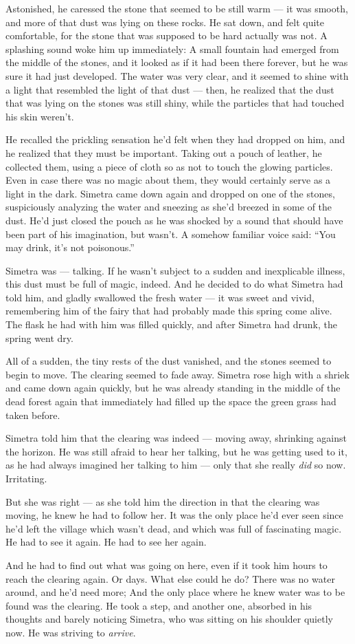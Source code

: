 Astonished, he caressed the stone that seemed to be still warm --- it was smooth, and more of that dust was lying on these rocks. He sat down, and felt quite comfortable, for the stone that was supposed to be hard actually was not.
A splashing sound woke him up immediately: A small fountain had emerged from the middle of the stones, and it looked as if it had been there forever, but he was sure it had just developed. 
The water was very clear, and it seemed to shine with a light that resembled the light of that dust --- then, he realized that the dust that was lying on the stones was still shiny, while the particles that had touched his skin weren't.

He recalled the prickling sensation he'd felt when they had dropped on him, and he realized that they must be important. Taking out a pouch of leather, he collected them, using a piece of cloth so as not to touch the glowing particles. Even in case there was no magic about them, they would certainly serve as a light in the dark. 
Simetra came down again and dropped on one of the stones, suspiciously analyzing the water and sneezing as she'd breezed in some of the dust. 
He'd just closed the pouch as he was shocked by a sound that should have been part of his imagination, but wasn't. A somehow familiar voice said: \enquote{You may drink, it's not poisonous.}

Simetra was --- talking.
If he wasn't subject to a sudden and inexplicable illness, this dust must be full of magic, indeed. 
And he decided to do what Simetra had told him, and gladly swallowed the fresh water --- it was sweet and vivid, remembering him of the fairy that had probably made this spring come alive. The flask he had with him was filled quickly, and after Simetra had drunk, the spring went dry.

All of a sudden, the tiny rests of the dust vanished, and the stones seemed to begin to move. The clearing seemed to fade away. 
Simetra rose high with a shriek and came down again quickly, but he was already standing in the middle of the dead forest again that immediately had filled up the space the green grass had taken before.

Simetra told him that the clearing was indeed --- moving away, shrinking against the horizon.
He was still afraid to hear her talking, but he was getting used to it, as he had always imagined her talking to him --- only that she really \emph{did} so now. Irritating.

But she was right --- as she told him the direction in that the clearing was moving, he knew he had to follow her. It was the only place he'd ever seen since he'd left the village which wasn't dead, and which was full of fascinating magic. 
He had to see it again. 
He had to see her again.

And he had to find out what was going on here, even if it took him hours to reach the clearing again. Or days. 
What else could he do? There was no water around, and he'd need more; And the only place where he knew water was to be found was the clearing. 
He took a step, and another one, absorbed in his thoughts and barely noticing Simetra, who was sitting on his shoulder quietly now. 
He was striving to \emph{arrive}. 

